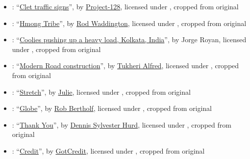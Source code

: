 \begin{itemize}
\item {}: ``\href{https://www.flickr.com/photos/project-128/14187511671/}{Clet traffic signs}'', by \href{https://www.flickr.com/photos/project-128/}{Project-128}, licensed under , cropped from original

\item {}: ``\href{https://www.flickr.com/photos/rod_waddington/50004674731/}{Hmong Tribe}'', by \href{https://www.flickr.com/people/rod_waddington/}{Rod Waddington}, licensed under , cropped from original

\item {}: ``\href{https://commons.wikimedia.org/wiki/File:India_-_Kolkata_coolies_-_3192.jpg}{Coolies pushing up a heavy load, Kolkata, India}'', by Jorge Royan, licensed under , cropped from original

\item {}: ``\href{https://commons.wikimedia.org/wiki/File:Charles_Alfred_a.k.a(Tukheri_Alfred)20.jpg}{Modern Road construction}'', by \href{https://commons.wikimedia.org/wiki/User:Tukheri_Alfred}{Tukheri Alfred}, licensed under , cropped from original

\item {}: ``\href{https://www.flickr.com/photos/julieeb/6121888498/}{Stretch}'', by \href{https://www.flickr.com/people/julieeb/}{Julie}, licensed under , cropped from original

\item {}: ``\href{https://www.flickr.com/photos/robbertholf/19644248265/}{Globe}'', by \href{https://www.flickr.com/people/robbertholf/}{Rob Bertholf}, licensed under , cropped from original

\item {}: ``\href{https://www.flickr.com/photos/dennissylvesterhurd/50161137826/}{Thank You}'', by \href{https://www.flickr.com/people/dennissylvesterhurd/}{Dennis Sylvester Hurd}, licensed under , cropped from original

\item {}: ``\href{https://www.flickr.com/photos/gotcredit/30023411230/}{Credit}'', by \href{https://www.gotcredit.com/}{GotCredit}, licensed under , cropped from original

\end{itemize}

